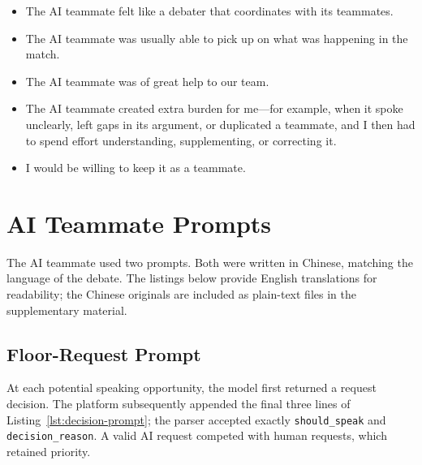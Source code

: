\documentclass[manuscript,review,anonymous]{acmart}
\begin{document}
\begin{itemize}
  \item The AI teammate felt like a debater that coordinates with its teammates.
  \item The AI teammate was usually able to pick up on what was happening in the match.
  \item The AI teammate was of great help to our team.
  \item The AI teammate created extra burden for me---for example, when it spoke unclearly, left gaps in its argument, or duplicated a teammate, and I then had to spend effort understanding, supplementing, or correcting it.
  \item I would be willing to keep it as a teammate.
\end{itemize}

\section{AI Teammate Prompts}
\label{app:ai-prompt}

The AI teammate used two prompts. Both were written in Chinese, matching the language of the debate. The listings below provide English translations for readability; the Chinese originals are included as plain-text files in the supplementary material.

\subsection{Floor-Request Prompt}
\label{app:decision-prompt}

At each potential speaking opportunity, the model first returned a request decision. The platform subsequently appended the final three lines of Listing~\ref{lst:decision-prompt}; the parser accepted exactly \texttt{should\_speak} and \texttt{decision\_reason}. A valid AI request competed with human requests, which retained priority.
\end{document}
